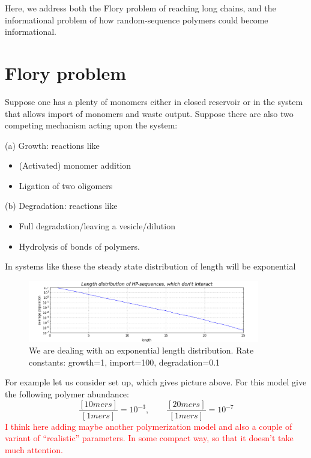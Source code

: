 \documentclass[12pt]{paper}
\newcommand{\pq}[1]{\left[ #1 \right]}
\newcommand{\red}[1]{\textcolor{red}{#1}}
\begin{document}
Here, we address both the Flory problem of reaching long chains, 
and the informational problem of how random-sequence polymers could become informational.



 



\section{Flory problem}
Suppose one has a plenty of monomers either in closed reservoir or in the system that allows 
import of monomers and waste output. Suppose there are also two competing mechanism acting upon 
the system: 
\par (a) Growth: reactions like
\begin{itemize}
 \item (Activated) monomer addition
 \item Ligation of two oligomers
\end{itemize}
\par (b) Degradation: reactions like
\begin{itemize}
 \item Full degradation/leaving a vesicle/dilution
 \item Hydrolysis of bonds of polymers.
\end{itemize}
In systems like these the steady state distribution of length will be exponential
\begin{figure}[h!]
  \centering
  \includegraphics[width=0.9\textwidth]{pictures/flory.png} 
  \caption{We are dealing with an exponential length distribution. 
    Rate constants: growth=1, import=100, degradation=0.1}
  \label{fig:flory}
\end{figure}

For example let us consider set up, which gives picture above. For this model give the following 
polymer abundance:
\begin{equation}
  \frac{\pq{10mers}}{\pq{1mers}}=10^{-3},\qquad\frac{\pq{20mers}}{\pq{1mers}}=10^{-7}
\end{equation} 
\red{I think here adding maybe another polymerization model and also a couple of variant of 
     ``realistic'' parameters. In some compact way, so that it doesn't take much attention.}
\end{document}
